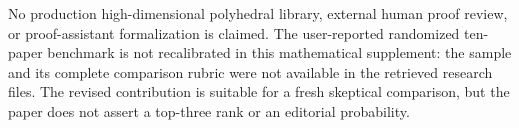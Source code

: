 No production high-dimensional polyhedral library, external human proof review, or proof-assistant formalization is claimed. The user-reported randomized ten-paper benchmark is not recalibrated in this mathematical supplement: the sample and its complete comparison rubric were not available in the retrieved research files. The revised contribution is suitable for a fresh skeptical comparison, but the paper does not assert a top-three rank or an editorial probability.
